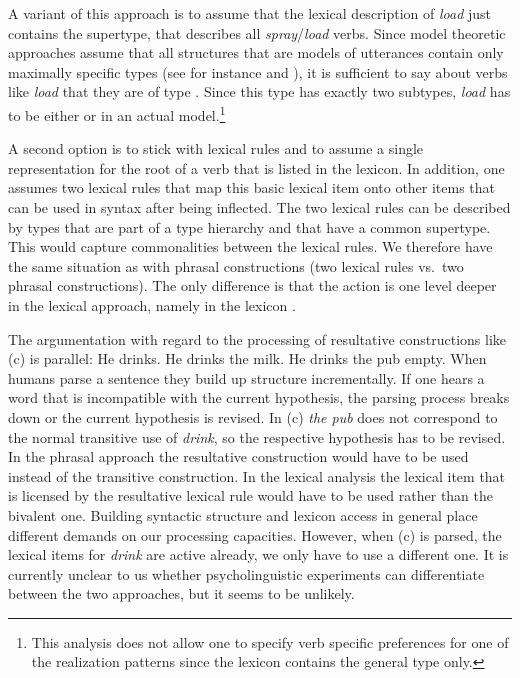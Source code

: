 \begin{exe}
\begin{xlist}[iv.]
\begin{exe}
\begin{xlist}[iv.]
A variant of this approach is to assume that the lexical description of \emph{load} just contains
the supertype, that describes all \emph{spray}/\emph{load} verbs. Since model theoretic approaches
assume that all structures that are models of utterances contain only maximally specific types (see
for instance  and ), it is sufficient to say about verbs like
\emph{load} that they are of type . Since this type has exactly two subtypes,
\emph{load} has to be either  or  in an actual model.\footnote{
  This analysis does not allow one to specify verb specific preferences for one of the realization
  patterns since the lexicon contains the general type only.
}

A second option is to stick with lexical rules and to assume a single representation for the root of
a verb that is listed in the lexicon. In addition, one assumes two lexical rules that map this basic
lexical item onto other items that can be used in syntax after being inflected. The two lexical
rules can be described by types that are part of a type hierarchy and that have a common
supertype. This would capture commonalities between the lexical rules. We therefore have the same
situation as with phrasal constructions (two lexical rules vs.\ two phrasal constructions). The only
difference is that the action is one level deeper in the lexical approach, namely in the lexicon \citep[--406]{Mueller2002b}. 

The argumentation with regard to the processing of resultative constructions like (c) is parallel:
\eal
\ex He drinks.
\ex He drinks the milk.
\ex He drinks the pub empty.
\zl
When humans parse a sentence they build up structure incrementally. If one hears a word that is
incompatible with the current hypothesis, the parsing process breaks down or the current hypothesis
is revised. In (c) \emph{the pub} does not correspond to the normal transitive use of
\emph{drink}, so the respective hypothesis has to be revised. In the phrasal approach the resultative
construction would have to be used instead of the transitive construction. In the lexical analysis
the lexical item that is licensed by the resultative lexical rule would have to be used rather than
the bivalent one. Building syntactic structure and lexicon access in general place different
demands on our processing capacities. However, when (c) is parsed, the lexical items for
\emph{drink} are active already, we only have to use a different one. It is currently unclear to us
whether psycholinguistic experiments can differentiate between the two approaches, but it seems to
be unlikely.



\end{xlist}
\end{exe}
\end{xlist}
\end{exe}
